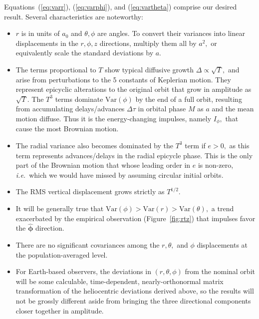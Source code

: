 \documentclass[linenumbers, onecolumn]{aastex631}
\newcommand{\ie}{\textit{i.e.\/}}
\newcommand{\phat}{\boldsymbol{\hat\phi}}
\newcommand{\Var}{\textrm{Var}}
\begin{document}
Equations~(\ref{eq:varr}), (\ref{eq:varphi}), and (\ref{eq:vartheta}) comprise our desired result.  Several characteristics are noteworthy:
\begin{itemize}
\item $r$ is in units of $a_0$ and $\theta, \phi$ are angles.  To convert their variances into linear displacements in the $r,\phi,z$ directions, multiply them all by $a^2,$ or equivalently scale the standard deviations by $a.$
\item The terms proportional to $T$ show typical diffusive growth $\Delta \propto \sqrt{T},$ and arise from perturbations to the 5 constants of Keplerian motion.  They represent epicyclic alterations to the original orbit that grow in amplitude as $\sqrt{T}.$  The $T^3$ terms dominate $\Var(\phi)$ by the end of a full orbit, resulting from accumulating delays/advances $\Delta\tau$ in orbital phase $M$ as $a$ and the mean motion diffuse.  Thus it is the energy-changing impulses, namely $I_\phi,$ that cause the most Brownian motion.
\item The radial variance also becomes dominated by the $T^3$ term if $e>0,$ as this term represents advances/delays in the radial epicycle phase.  This is the only part of the Brownian motion that whose leading order in $e$ is non-zero, \ie\ which we would have missed by assuming circular initial orbits.
\item The RMS vertical displacement grows strictly as $T^{1/2}.$
\item It will be generally true that $\Var(\phi) > \Var(r) > \Var(\theta),$ a trend exacerbated by the empirical observation (Figure~\ref{fig:rtz}) that impulses favor the $\phat$ direction.
\item There are no significant covariances among the $r,\theta,$ and $\phi$ displacements at the population-averaged level.
  \item For Earth-based observers, the deviations in $(r,\theta,\phi)$ from the nominal orbit will be some calculable, time-dependent, nearly-orthonormal matrix transformation of the heliocentric deviations derived above, so the results will not be grossly different aside from bringing the three directional components closer together in amplitude.
\end{itemize}
\end{document}
